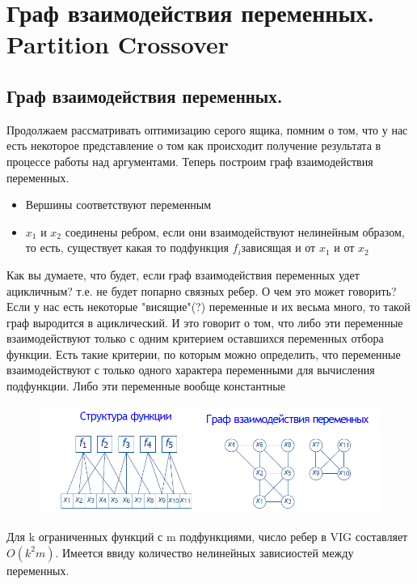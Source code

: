 \section{Граф взаимодействия переменных. Partition Crossover}
\subsection{Граф взаимодействия переменных.}
Продолжаем рассматривать оптимизацию серого ящика, помним о том, что у нас есть некоторое представление о том как происходит получение результата в процессе работы над аргументами. Теперь построим граф взаимодействия переменных.
\begin{itemize}
    \item Вершины соответствуют переменным
    \item $x_1$ и $x_2$ соединены ребром, если они взаимодействуют нелинейным образом, то есть, существует какая то подфункция $f_i $зависящая и от $x_1$ и от $x_2$
\end{itemize}
Как вы думаете, что будет, если граф взаимодействия переменных удет ацикличным? т.е. не будет попарно связных ребер. О чем это может говорить?\\
Если у нас есть некоторые "висящие"(?) переменные и их весьма много, то такой граф выродится в ациклический. И это говорит о том, что либо эти переменные взаимодействуют только с одним критерием оставшихся переменных отбора функции. Есть такие критерии, по которым можно определить, что переменные взаимодействуют с только одного характера переменными для вычисления подфункции. Либо эти переменные вообще константные\\
\begin{figure}[h]
\centering
\includegraphics[width=0.8\linewidth]{images/graf.PNG}
\end{figure}
Для k ограниченных функций с m подфункциями, число ребер в VIG составляет $O(k^2m)$. Имеется ввиду количество нелинейных зависиостей между переменных.
